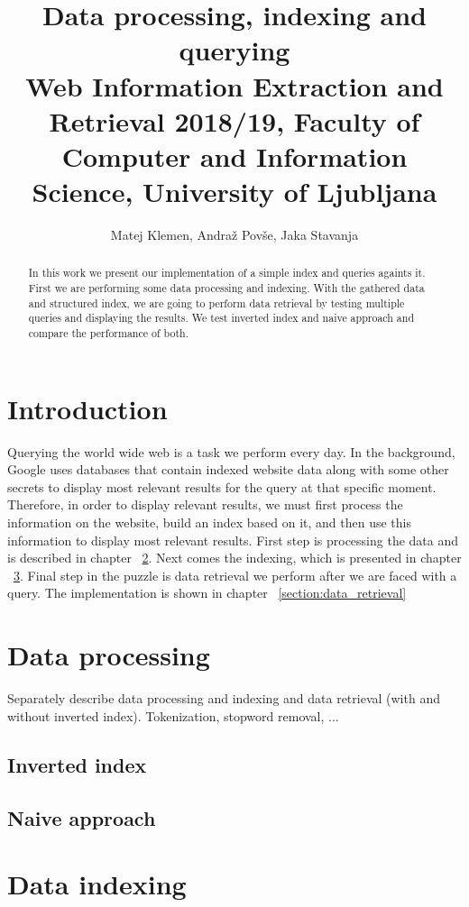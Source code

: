 \documentclass[9pt]{IEEEtran}
\title{\vspace{0ex} %
Data processing, indexing and querying
\\ \normalsize{Web Information Extraction and Retrieval 2018/19, Faculty of Computer and Information Science, University of Ljubljana}}
\author{ %
Matej Klemen, Andraž Povše, Jaka Stavanja
\vspace{-4.0ex}
}
\begin{document}
\maketitle

\begin{abstract}
In this work we present our implementation of a simple index and queries againts it.
First we are performing some data processing and indexing.
With the gathered data and structured index, we are going to perform data retrieval by testing multiple queries and displaying the results.
We test inverted index and naive approach and compare the performance of both.
\end{abstract}

\section{Introduction}
Querying the world wide web is a task we perform every day.
In the background, Google uses databases that contain indexed website data along with some other secrets to display most relevant results for the query at that specific moment.
Therefore, in order to display relevant results, we must first process the information on the website, build an index based on it, and then use this information to display most relevant results.
First step is processing the data and is described in chapter ~\ref{section:data_processing}.
Next comes the indexing, which is presented in chapter ~\ref{section:data_indexing}.
Final step in the puzzle is data retrieval we perform after we are faced with a query. The implementation is shown in chapter ~\ref{section:data_retrieval}

\section{Data processing}
\label{section:data_processing}
Separately describe data processing and indexing and data retrieval (with and without inverted index).
Tokenization, stopword removal, ...
\subsection{Inverted index}

\subsection{Naive approach}


\section{Data indexing}
\label{section:data_indexing}
\end{document}
